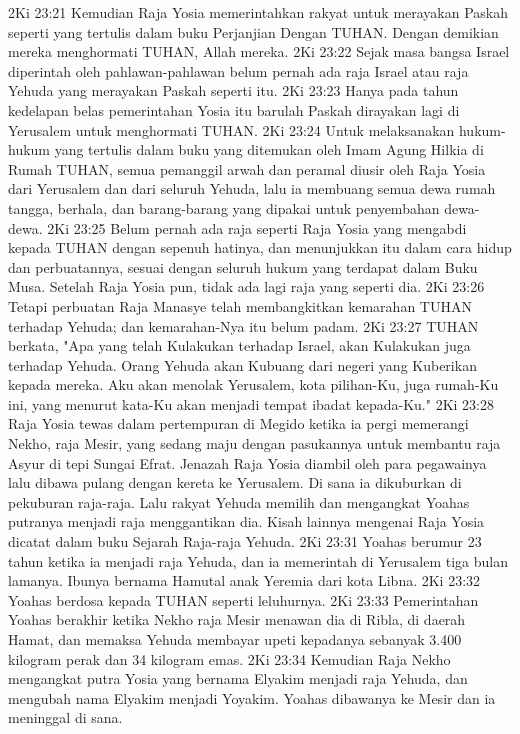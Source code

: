 2Ki 23:21  Kemudian Raja Yosia memerintahkan rakyat untuk merayakan Paskah seperti yang tertulis dalam buku Perjanjian Dengan TUHAN. Dengan demikian mereka menghormati TUHAN, Allah mereka.
2Ki 23:22  Sejak masa bangsa Israel diperintah oleh pahlawan-pahlawan belum pernah ada raja Israel atau raja Yehuda yang merayakan Paskah seperti itu.
2Ki 23:23  Hanya pada tahun kedelapan belas pemerintahan Yosia itu barulah Paskah dirayakan lagi di Yerusalem untuk menghormati TUHAN.
2Ki 23:24  Untuk melaksanakan hukum-hukum yang tertulis dalam buku yang ditemukan oleh Imam Agung Hilkia di Rumah TUHAN, semua pemanggil arwah dan peramal diusir oleh Raja Yosia dari Yerusalem dan dari seluruh Yehuda, lalu ia membuang semua dewa rumah tangga, berhala, dan barang-barang yang dipakai untuk penyembahan dewa-dewa.
2Ki 23:25  Belum pernah ada raja seperti Raja Yosia yang mengabdi kepada TUHAN dengan sepenuh hatinya, dan menunjukkan itu dalam cara hidup dan perbuatannya, sesuai dengan seluruh hukum yang terdapat dalam Buku Musa. Setelah Raja Yosia pun, tidak ada lagi raja yang seperti dia.
2Ki 23:26  Tetapi perbuatan Raja Manasye telah membangkitkan kemarahan TUHAN terhadap Yehuda; dan kemarahan-Nya itu belum padam.
2Ki 23:27  TUHAN berkata, "Apa yang telah Kulakukan terhadap Israel, akan Kulakukan juga terhadap Yehuda. Orang Yehuda akan Kubuang dari negeri yang Kuberikan kepada mereka. Aku akan menolak Yerusalem, kota pilihan-Ku, juga rumah-Ku ini, yang menurut kata-Ku akan menjadi tempat ibadat kepada-Ku."
2Ki 23:28  Raja Yosia tewas dalam pertempuran di Megido ketika ia pergi memerangi Nekho, raja Mesir, yang sedang maju dengan pasukannya untuk membantu raja Asyur di tepi Sungai Efrat. Jenazah Raja Yosia diambil oleh para pegawainya lalu dibawa pulang dengan kereta ke Yerusalem. Di sana ia dikuburkan di pekuburan raja-raja. Lalu rakyat Yehuda memilih dan mengangkat Yoahas putranya menjadi raja menggantikan dia. Kisah lainnya mengenai Raja Yosia dicatat dalam buku Sejarah Raja-raja Yehuda.
2Ki 23:31  Yoahas berumur 23 tahun ketika ia menjadi raja Yehuda, dan ia memerintah di Yerusalem tiga bulan lamanya. Ibunya bernama Hamutal anak Yeremia dari kota Libna.
2Ki 23:32  Yoahas berdosa kepada TUHAN seperti leluhurnya.
2Ki 23:33  Pemerintahan Yoahas berakhir ketika Nekho raja Mesir menawan dia di Ribla, di daerah Hamat, dan memaksa Yehuda membayar upeti kepadanya sebanyak 3.400 kilogram perak dan 34 kilogram emas.
2Ki 23:34  Kemudian Raja Nekho mengangkat putra Yosia yang bernama Elyakim menjadi raja Yehuda, dan mengubah nama Elyakim menjadi Yoyakim. Yoahas dibawanya ke Mesir dan ia meninggal di sana.
